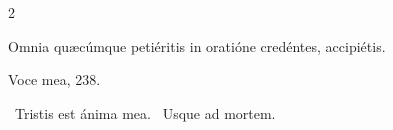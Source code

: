 \documentclass[9pt,twoside]{extarticle}
\begin{document}
\begin{multicols}{2}
%
%
%
%
%
%
%
%
%
%
%
%
%
\begin{tightlist}{}
\item {} Omnia quæcúmque petiéritis in oratióne credéntes, accipiétis.
\item {} Voce mea, 238.
\end{tightlist}
%
%
%
%
%
%
%
%
%
%
%
\begin{tightlist}{}
\item {}~Tristis est ánima mea. ~Usque ad mortem.
\end{tightlist}


\end{multicols}
\end{document}
